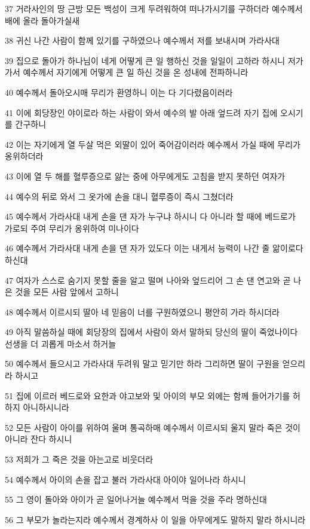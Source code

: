 \par 37 거라사인의 땅 근방 모든 백성이 크게 두려워하여 떠나가시기를 구하더라 예수께서 배에 올라 돌아가실새
\par 38 귀신 나간 사람이 함께 있기를 구하였으나 예수께서 저를 보내시며 가라사대
\par 39 집으로 돌아가 하나님이 네게 어떻게 큰 일 행하신 것을 일일이 고하라 하시니 저가 가서 예수께서 자기에게 어떻게 큰 일 하신 것을 온 성내에 전파하니라
\par 40 예수께서 돌아오시매 무리가 환영하니 이는 다 기다렸음이러라
\par 41 이에 회당장인 야이로라 하는 사람이 와서 예수의 발 아래 엎드려 자기 집에 오시기를 간구하니
\par 42 이는 자기에게 열 두살 먹은 외딸이 있어 죽어감이러라 예수께서 가실 때에 무리가 옹위하더라
\par 43 이에 열 두 해를 혈루증으로 앓는 중에 아무에게도 고침을 받지 못하던 여자가
\par 44 예수의 뒤로 와서 그 옷가에 손을 대니 혈루증이 즉시 그쳤더라
\par 45 예수께서 가라사대 내게 손을 댄 자가 누구냐 하시니 다 아니라 할 때에 베드로가 가로되 주여 무리가 옹위하여 미나이다
\par 46 예수께서 가라사대 내게 손을 댄 자가 있도다 이는 내게서 능력이 나간 줄 앎이로다 하신대
\par 47 여자가 스스로 숨기지 못할 줄을 알고 떨며 나아와 엎드리어 그 손 댄 연고와 곧 나은 것을 모든 사람 앞에서 고하니
\par 48 예수께서 이르시되 딸아 네 믿음이 너를 구원하였으니 평안히 가라 하시더라
\par 49 아직 말씀하실 때에 회당장의 집에서 사람이 와서 말하되 당신의 딸이 죽었나이다 선생을 더 괴롭게 마소서 하거늘
\par 50 예수께서 들으시고 가라사대 두려워 말고 믿기만 하라 그리하면 딸이 구원을 얻으리라 하시고
\par 51 집에 이르러 베드로와 요한과 야고보와 및 아이의 부모 외에는 함께 들어가기를 허하지 아니하시니라
\par 52 모든 사람이 아이를 위하여 울며 통곡하매 예수께서 이르시되 울지 말라 죽은 것이 아니라 잔다 하시니
\par 53 저희가 그 죽은 것을 아는고로 비웃더라
\par 54 예수께서 아이의 손을 잡고 불러 가라사대 아이야 일어나라 하시니
\par 55 그 영이 돌아와 아이가 곧 일어나거늘 예수께서 먹을 것을 주라 명하신대
\par 56 그 부모가 놀라는지라 예수께서 경계하사 이 일을 아무에게도 말하지 말라 하시니라

